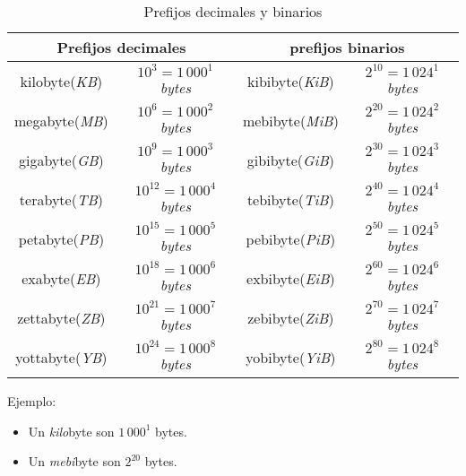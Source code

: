 \documentclass[12pt]{article}
\begin{document}
\begin{table}[h]

    \centering

    \caption{Prefijos decimales y binarios}
    \label{tablaComparacionPrefijos}

    \begin{tabular}{ | c | c | c | c | }
        \hline
        \multicolumn{2}{|c|}{\textbf{Prefijos decimales}} &
        \multicolumn{2}{|c|}{\textbf{prefijos binarios}}\\
        \hline
        \hline
        kilobyte(\emph{KB}) & $10^{3}=1\,000^{1}$\emph{bytes} &
        kibibyte(\emph{KiB}) & $2^{10}=1\,024^{1}$\emph{bytes} \\
        \hline
        megabyte(\emph{MB}) & $10^{6}=1\,000^{2}$\emph{bytes} &
        mebibyte(\emph{MiB}) & $2^{20}=1\,024^{2}$\emph{bytes} \\
        \hline
        gigabyte(\emph{GB}) & $10^{9}=1\,000^{3}$\emph{bytes} &
        gibibyte(\emph{GiB}) & $2^{30}=1\,024^{3}$\emph{bytes} \\
        \hline
        terabyte(\emph{TB}) & $10^{12}=1\,000^{4}$\emph{bytes} &
        tebibyte(\emph{TiB}) & $2^{40}=1\,024^{4}$\emph{bytes} \\
        \hline
        petabyte(\emph{PB}) & $10^{15}=1\,000^{5}$\emph{bytes} &
        pebibyte(\emph{PiB}) & $2^{50}=1\,024^{5}$\emph{bytes} \\
        \hline
        exabyte(\emph{EB}) & $10^{18}=1\,000^{6}$\emph{bytes} &
        exbibyte(\emph{EiB}) & $2^{60}=1\,024^{6}$\emph{bytes} \\
        \hline
        zettabyte(\emph{ZB}) & $10^{21}=1\,000^{7}$\emph{bytes} &
        zebibyte(\emph{ZiB}) & $2^{70}=1\,024^{7}$\emph{bytes} \\
        \hline
        yottabyte(\emph{YB}) & $10^{24}=1\,000^{8}$\emph{bytes} &
        yobibyte(\emph{YiB}) & $2^{80}=1\,024^{8}$\emph{bytes} \\
        \hline
    \end{tabular}

    \vspace{2\topsep}
    Ejemplo:
    \vspace{-1\topsep}
    \begin{itemize}

        \itemsep2pt \parskip0pt 
        \item   Un \emph{kilo}byte son $1\,000^{1}$ bytes.
        \item   Un \emph{mebi}byte son $2^{20}$ bytes.

    \end{itemize}

\end{table}
\end{document}
